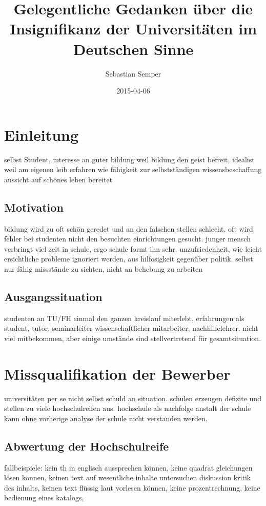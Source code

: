 \documentclass[a4paper,10pt,twoside,titlepage]{article}
\author{Sebastian Semper}
\title{Gelegentliche Gedanken über die Insignifikanz der Universitäten im Deutschen Sinne}
\date{2015-04-06}
\begin{document}
\maketitle

\tableofcontents

\newpage


\section{Einleitung}
selbst Student, interesse an guter bildung weil bildung den geist befreit, idealist weil am eigenen leib erfahren wie fähigkeit zur selbstständigen wissensbeschaffung aussicht auf schönes leben bereitet

\subsection{Motivation}
bildung wird zu oft schön geredet und an den falschen stellen schlecht. oft wird fehler bei studenten nicht den besuchten einrichtungen gesucht. junger mensch verbringt viel zeit in schule, ergo schule formt ihn sehr. unzufriedenheit, wie leicht ersichtliche probleme ignoriert werden, aus hilfosigkeit gegenüber politik. selbst nur fähig missstände zu sichten, nicht an behebung zu arbeiten

\subsection{Ausgangssituation}
studenten an TU/FH einmal den ganzen kreislauf miterlebt, erfahrungen als student, tutor, seminarleiter wissenschaftlicher mitarbeiter, nachhilfelehrer. nicht viel mitbekommen, aber einige umstände sind stellvertretend für gesamtsituation.

\section{Missqualifikation der Bewerber}
universitäten per se nicht selbst schuld an situation. schulen erzeugen defizite und stellen zu viele hochschulreifen aus. hochschule als nachfolge anstalt der schule kann ohne vorherige analyse der schule nicht verstanden werden.

\subsection{Abwertung der Hochschulreife}
fallbeispiele: kein th in englisch aussprechen können, keine quadrat gleichungen lösen können, keinen text auf wesentliche inhalte untersuchen diskussion kritik des inhalts, keinen text flüssig laut vorlesen können, keine prozentrechnung, keine bedienung eines katalogs,
\end{document}
